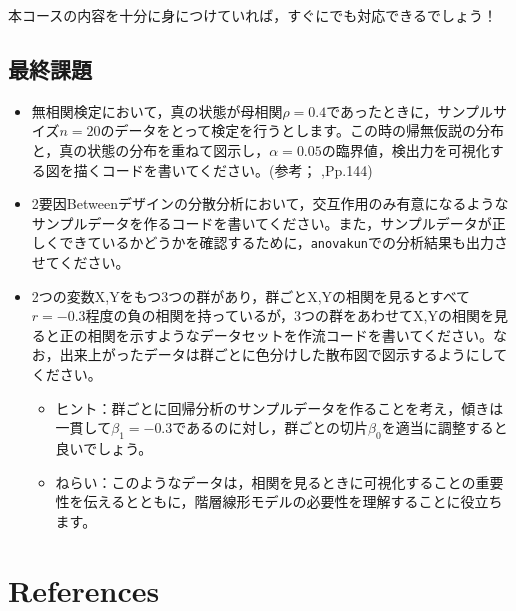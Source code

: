 \documentclass[
  a4paper,
]{ltjsbook}
\providecommand{\tightlist}{%
  \setlength{\itemsep}{0pt}\setlength{\parskip}{0pt}}
\begin{document}
本コースの内容を十分に身につけていれば，すぐにでも対応できるでしょう！

\section{最終課題}\label{ux6700ux7d42ux8ab2ux984c}

\begin{itemize}
\item
  無相関検定において，真の状態が母相関\(\rho=0.4\)であったときに，サンプルサイズ\(n=20\)のデータをとって検定を行うとします。この時の帰無仮説の分布と，真の状態の分布を重ねて図示し，\(\alpha=0.05\)の臨界値，検出力を可視化する図を描くコードを書いてください。(参考；\textcite{Haebara200206}
  ,Pp.144)
\item
  2要因Betweenデザインの分散分析において，交互作用のみ有意になるようなサンプルデータを作るコードを書いてください。また，サンプルデータが正しくできているかどうかを確認するために，\texttt{anovakun}での分析結果も出力させてください。
\item
  2つの変数X,Yをもつ3つの群があり，群ごとX,Yの相関を見るとすべて\(r = -0.3\)程度の負の相関を持っているが，3つの群をあわせてX,Yの相関を見ると正の相関を示すようなデータセットを作流コードを書いてください。なお，出来上がったデータは群ごとに色分けした散布図で図示するようにしてください。

  \begin{itemize}
  \tightlist
  \item
    ヒント：群ごとに回帰分析のサンプルデータを作ることを考え，傾きは一貫して\(\beta_1=-0.3\)であるのに対し，群ごとの切片\(\beta_0\)を適当に調整すると良いでしょう。
  \item
    ねらい：このようなデータは，相関を見るときに可視化することの重要性を伝えるとともに，階層線形モデルの必要性を理解することに役立ちます。
  \end{itemize}
\end{itemize}


\chapter*{References}\label{references}


\printbibliography[heading=none]
\end{document}

